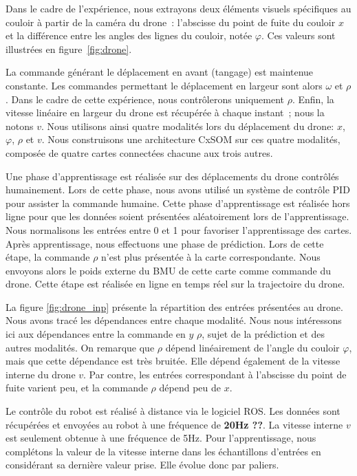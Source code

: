 \documentclass[../main]{subfiles}
\begin{document}
Dans le cadre de l'expérience, nous extrayons deux éléments visuels spécifiques au couloir à partir de la caméra du drone~: l'abscisse du point de fuite du couloir $x$ et la différence entre les angles des lignes du couloir, notée $\varphi$. Ces valeurs sont illustrées en figure~\ref{fig:drone}.

La commande générant le déplacement en avant (tangage) est maintenue constante. Les commandes permettant le déplacement en largeur sont alors $\omega$ et $\rho$. Dans le cadre de cette expérience, nous contrôlerons uniquement $\rho$.
Enfin, la vitesse linéaire en largeur du drone est récupérée à chaque instant~; nous la notons $v$.
Nous utilisons ainsi quatre modalités lors du déplacement du drone: $x$, $\varphi$, $\rho$ et $v$.
Nous construisons une architecture CxSOM sur ces quatre modalités, composée de quatre cartes connectées chacune aux trois autres.

Une phase d'apprentissage est réalisée sur des déplacements du drone contrôlés humainement. Lors de cette phase, nous avons utilisé un système de contrôle PID pour assister la commande humaine. Cette phase d'apprentissage est réalisée hors ligne pour que les données soient présentées aléatoirement lors de l'apprentissage. Nous normalisons les entrées entre 0 et 1 pour favoriser l'apprentissage des cartes.
Après apprentissage, nous effectuons une phase de prédiction. Lors de cette étape, la commande $\rho$ n'est plus présentée à la carte correspondante. 
Nous envoyons alors le poids externe du BMU de cette carte comme commande du drone. Cette étape est réalisée en ligne en temps réel sur la trajectoire du drone.

La figure \ref{fig:drone_inp} présente la répartition des entrées présentées au drone. Nous avons tracé les dépendances entre chaque modalité. Nous nous intéressons ici aux dépendances entre la commande en $y$ $\rho$, sujet de la prédiction et des autres modalités.
On remarque que $\rho$ dépend linéairement de l'angle du couloir $\varphi$, mais que cette dépendance est très bruitée. Elle dépend également de la vitesse interne du drone $v$. Par contre, les entrées correspondant à l'abscisse du point de fuite varient peu, et la commande $\rho$ dépend peu de $x$.

Le contrôle du robot est réalisé à distance via le logiciel ROS. Les données sont récupérées et envoyées au robot à une fréquence de \textbf{20Hz ??}. La vitesse interne $v$ est seulement obtenue à une fréquence de 5Hz. Pour l'apprentissage, nous complétons la valeur de la vitesse interne dans les échantillons d'entrées en considérant sa dernière valeur prise. Elle évolue donc par paliers.
\end{document}
